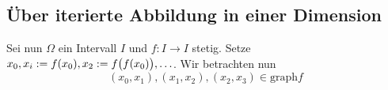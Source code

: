 \subsection*{Über iterierte Abbildung in einer Dimension} %
\label{sub:uber_iterierte_abbildung_in_einer_dimension}
Sei nun $\Omega $ ein Intervall $I$ und $f \colon I \to I$ stetig. Setze $x_0, x_i := f(x_0), x_2 := f \enbrace[\big]{f(x_0)},\ldots $. Wir betrachten nun
\[
	(x_0,x_1), (x_1, x_2), (x_2, x_3) \in \mathrm{graph} f
\]




\cleardoubleoddemptypage
{}
\setcounter{page}{1}
\printindex
\listoffigures
\todototoc
{}
